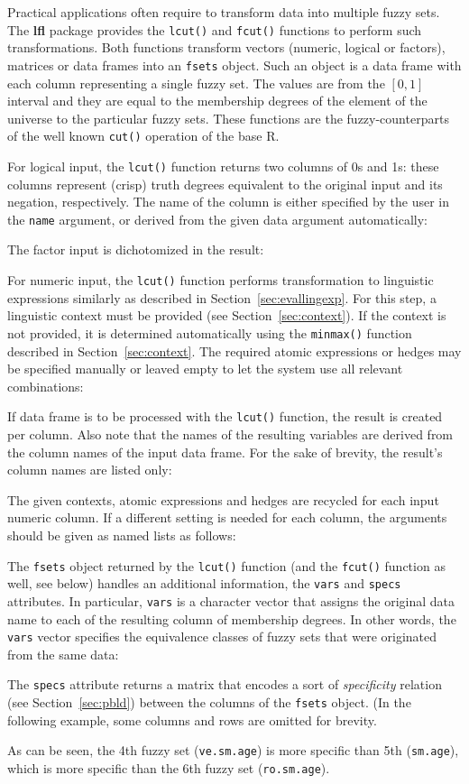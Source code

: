 \documentclass[review]{elsarticle}
\newcommand{\pkg}[1]{\textbf{#1}}
\newcommand{\proglang}[1]{#1}
\newcommand{\code}[1]{\texttt{#1}}
\newcommand{\R}{\proglang{R}}
\begin{document}
Practical applications often require to transform data into multiple fuzzy sets. The \pkg{lfl} package provides the \code{lcut()} and \code{fcut()} functions to perform such transformations. Both functions transform vectors (numeric, logical or factors), matrices or data frames into an \code{fsets} object. Such an object is a data frame with each column representing a single fuzzy set. The values are from the $[0, 1]$ interval and they are equal to the membership degrees of the element of the universe to the particular fuzzy sets. These functions are the fuzzy-counterparts of the well known \code{cut()} operation of the base \R{}.

For logical input, the \code{lcut()} function returns two columns of 0s and 1s: these columns represent (crisp) truth degrees equivalent to the original input and its negation, respectively. The name of the column is either specified by the user in the \code{name} argument, or derived from the given data argument automatically:
%

%
The factor input is dichotomized in the result:
%


For numeric input, the \code{lcut()} function performs transformation to linguistic expressions similarly as described in Section~\ref{sec:evallingexp}. For this step, a linguistic context must be provided (see Section~\ref{sec:context}). If the context is not provided, it is determined automatically using the \code{minmax()} function described in Section~\ref{sec:context}. The required atomic expressions or hedges may be specified manually or leaved empty to let the system use all relevant combinations:
%


If data frame is to be processed with the \code{lcut()} function, the result is created per column. Also note that the names of the resulting variables are derived from the column names of the input data frame. For the sake of brevity, the result's column names are listed only:
%

%
The given contexts, atomic expressions and hedges are recycled for each input numeric column. If a different setting is needed for each column, the arguments should be given as named lists as follows:
%



The \code{fsets} object returned by the \code{lcut()} function (and the \code{fcut()} function as well, see below) handles an additional information, the \code{vars} and \code{specs} attributes. In particular, \code{vars} is a character vector that assigns the original data name to each of the resulting column of membership degrees. In other words, the \code{vars} vector specifies the equivalence classes of fuzzy sets that were originated from the same data:
%

%
The \code{specs} attribute returns a matrix that encodes a sort of \emph{specificity} relation (see Section~\ref{sec:pbld}) between the columns of the \code{fsets} object. (In the following example, some columns and rows are omitted for brevity.
%

%
As can be seen, the 4th fuzzy set (\code{ve.sm.age}) is more specific than 5th (\code{sm.age}), which is more specific than the 6th fuzzy set (\code{ro.sm.age}).
\end{document}

